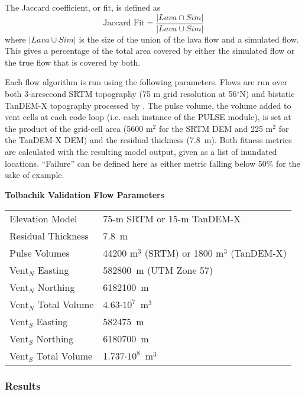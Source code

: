 		The Jaccard coefficient, or fit, is defined as 
		\begin{equation}
			\text{Jaccard~Fit}=\frac{|Lava\cap Sim|}{|Lava\cup Sim|}
		\end{equation}
		where $|Lava\cup Sim|$ is the size of the union of the lava flow and a simulated flow. This gives a percentage of the total area covered by either the simulated flow or the true flow that is covered by both.
		
		Each flow algorithm is run using the following parameters. Flows are run over both 3-arcsecond SRTM topography (75 m grid resolution at 56$^{\circ}$N) and bistatic TanDEM-X topography processed by \citet{kubanek2015lava}. The pulse volume, the volume added to vent cells at each code loop (i.e. each instance of the PULSE module), is set at the product of the grid-cell area (5600 m$^2$ for the SRTM DEM and 225 m$^2$ for the TanDEM-X DEM) and the residual thickness (7.8~m). Both fitness metrics are calculated with the resulting model output, given as a list of inundated locations. ``Failure'' can be defined here as either metric falling below 50\% for the sake of example.
		
		\begin{center}
			\textbf{Tolbachik Validation Flow Parameters}\\
			\begin{tabular}{l l}
				\toprule
				Elevation Model & 75-m SRTM or 15-m TanDEM-X\\
				Residual Thickness & 7.8~m\\
				Pulse Volumes & 44200 m$^3$ (SRTM) or 1800 m$^3$ (TanDEM-X)\\
				\midrule
				Vent$_N$ Easting & 582800~m (UTM Zone 57)\\
				Vent$_N$ Northing & 6182100~m\\
				Vent$_N$ Total Volume & 4.63$\cdot10^7$~m$^3$\\
				\midrule
				Vent$_S$ Easting & 582475~m\\
				Vent$_S$ Northing & 6180700~m\\
				Vent$_S$ Total Volume & 1.737$\cdot10^8$~m$^3$\\
				\bottomrule
			\end{tabular}
		\end{center}
			
	\subsubsection{Results}
	
